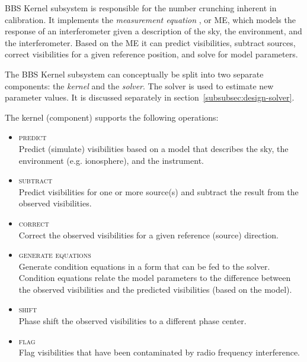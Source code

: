 \documentclass[10pt]{lofar}
\newcommand{\predict}{\textsc{predict}\xspace}
\newcommand{\subtract}{\textsc{subtract}\xspace}
\newcommand{\correct}{\textsc{correct}\xspace}
\newcommand{\generate}{\textsc{generate equations}\xspace}
\newcommand{\shift}{\textsc{shift}\xspace}
\newcommand{\flag}{\textsc{flag}\xspace}
\begin{document}


BBS Kernel subsystem is responsible for the number crunching inherent in
calibration. It implements the \emph{measurement equation} \cite{Hamaker1996-1,
aips++note185}, or ME, which models the response of an interferometer given a
description of the sky, the environment, and the interferometer. Based on the
ME it can predict visibilities, subtract sources, correct visibilities for a
given reference position, and solve for model parameters.

The BBS Kernel subsystem can conceptually be split into two separate components:
the \emph{kernel} and the \emph{solver}. The solver is used to estimate new
parameter values. It is discussed separately in
section~\ref{subsubsec:design-solver}.

The kernel (component) supports the following operations:

\begin{itemize}
\item \predict\\
Predict (simulate) visibilities based on a model that describes the sky, the
environment (e.g. ionosphere), and the instrument.
\item \subtract\\
Predict visibilities for one or more source(s) and subtract the result from the
observed visibilities.
\item \correct\\
Correct the observed visibilities for a given reference (source) direction.
\item \generate\\
Generate condition equations in a form that can be fed to the solver. Condition
equations relate the model parameters to the difference between the observed
visibilities and the predicted visibilities (based on the model).
\item \shift\\
Phase shift the observed visibilities to a different phase center.
\item \flag\\
Flag visibilities that have been contaminated by radio frequency interference.
\end{itemize}
\end{document}
